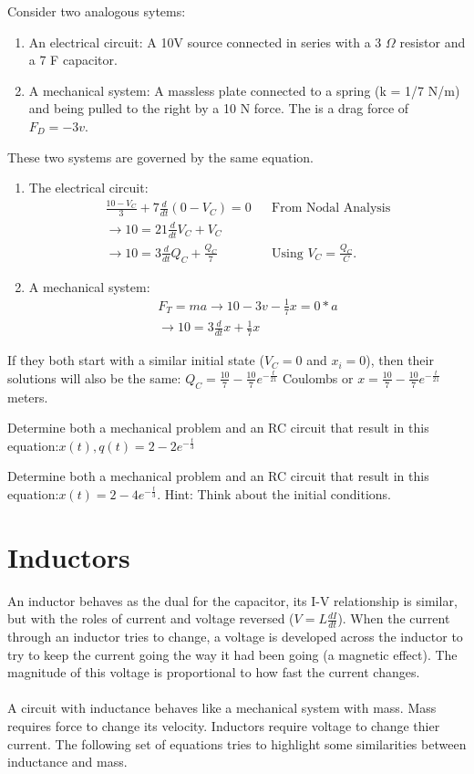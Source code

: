 Consider two analogous sytems:
\begin{enumerate}
\item An electrical circuit: A 10V source connected in series with a 3 $\Omega$ resistor and a 7 F capacitor.
\item A mechanical system: A massless plate connected to a spring (k = 1/7 N/m) and being pulled to the right by a 10 N force. The is a drag force of $F_D=-3v$.
\end{enumerate}
These two systems are governed by the same equation.
\begin{enumerate}
\item The electrical circuit:
\begin{align*}
\frac{10-V_C}{3}+7\frac{d}{dt}(0-V_C)=0&&\text{From Nodal Analysis}\\ 
\rightarrow 10=21\frac{d}{dt}V_C+V_C \\
\rightarrow 10=3\frac{d}{dt}Q_C+\frac{Q_C}{7}&&\text{Using $V_C = \frac{Q_C}{C}$}.
\end{align*}
\item A mechanical system: 
\begin{align*}
F_T=ma \rightarrow 10-3v-\frac{1}{7}x=0*a \\
\rightarrow 10=3\frac{d}{dt}x+\frac{1}{7}x
\end{align*}
\end{enumerate}

If they both start with a similar initial state ($V_C=0$ and $x_i=0$), then their solutions will also be the same: $Q_C=\frac{10}{7}-\frac{10}{7}e^{-\frac{t}{21}}$ Coulombs or $x=\frac{10}{7}-\frac{10}{7}e^{-\frac{t}{21}}$ meters.

\begin{clevel}
Determine both a mechanical problem and an RC circuit that result in this equation:$x(t),q(t)=2-2e^{-\frac{t}{3}}$
\end{clevel}

\begin{dlevel}
Determine both a mechanical problem and an RC circuit that result in this equation:$x(t)=2-4e^{-\frac{t}{3}}$. Hint: Think about the initial conditions.
\end{dlevel}


\section{Inductors}
An inductor behaves as the dual for the capacitor, its I-V relationship is similar, but with the roles of current and voltage reversed ($V=L\frac{dI}{dt}$). When the current through an inductor tries to change, a voltage is developed across the inductor to try to keep the current going the way it had been going (a magnetic effect). The magnitude of this voltage is proportional to how fast the current changes.\\
\\
A circuit with inductance behaves like a mechanical system with mass. Mass requires force to change its velocity. Inductors require voltage to change thier current. The following set of equations tries to highlight some similarities between inductance and mass.

